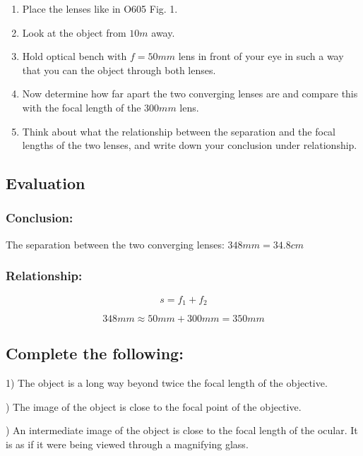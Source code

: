 \documentclass[12pt]{article}
\begin{document}
\begin{enumerate}
\item Place the lenses like in O605 Fig. 1.
\item Look at the object from $10m$ away.
\item Hold optical bench with $f=50mm$ lens in front of your eye in such a way that you can the object through both lenses.
\item Now determine how far apart the two converging lenses are and compare this with the focal length of the $300mm$ lens.
\item Think about what the relationship between the separation and the focal lengths of the two lenses, and write down your conclusion under relationship.
\end{enumerate}

\subsection*{Evaluation}

\subsubsection*{Conclusion:}
The separation between the two converging lenses: $348 mm =34.8 cm$

\subsubsection*{Relationship:}

\begin{equation}
s = f_1 + f_2
\end{equation}

\begin{equation}
348 mm \approx 50 mm + 300 mm  = 350mm
\end{equation}

\subsection*{Complete the following:}

1) The object is a long way beyond twice the focal length of the objective.

) The image of the object is close to the focal point of the objective.

) An intermediate image of the object is close to the focal length of the ocular. It is as if it were being
viewed through a magnifying glass.
\end{document}
